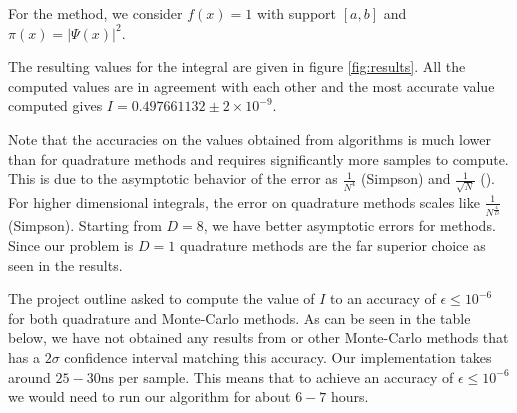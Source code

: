 \documentclass[10pt, a4paper]{article}
\newcommand{\final}{$I = 0.497661132 \pm 2\times10^{-9}$}
\begin{document}
  For the \apis{} method, we consider $f(x) = 1$ with support $[a,b]$ and $\pi(x) = |\Psi(x)|^2$.

  The resulting values for the integral are given in figure \ref{fig:results}. All the computed values
  are in agreement with each other and the most accurate value computed gives \final.

  Note that the accuracies on the values obtained from \is{} algorithms is much lower than for quadrature
  methods and requires significantly more samples to compute. This is due to the asymptotic behavior of
  the error as $\frac{1}{N^4}$ (Simpson) and $\frac{1}{\sqrt{N}}$ (\is). For higher dimensional integrals,
  the error on quadrature methods scales like $\frac{1}{N^{\frac4D}}$ (Simpson). Starting from $D=8$, we have
  better asymptotic errors for \is{} methods. Since our problem is $D=1$ quadrature methods are
  the far superior choice as seen in the results.

  The project outline asked to compute the value of $I$ to an accuracy of $\epsilon \le 10^{-6}$ for
  both quadrature and Monte-Carlo methods. As can be seen in the table below, we have not obtained
  any results from \is{} or other Monte-Carlo methods that has a $2\sigma$ confidence interval matching
  this accuracy. Our implementation takes around $25-30$ns per sample. This means that to achieve an
  accuracy of $\epsilon \le 10^{-6}$ we would need to run our algorithm for about $6-7$ hours\footnotemark.

\end{document}
